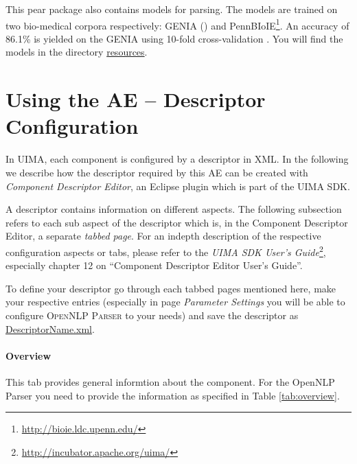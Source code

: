 \documentclass[11pt,a4paper,halfparskip]{scrartcl}
\begin{document}
This pear package also contains models for parsing. The
models are trained on two bio-medical corpora respectively: \textsc{GENIA} (\cite{ohta02})
and PennBIoIE\footnote{\url{http://bioie.ldc.upenn.edu/}}. An accuracy of 86.1\% is
yielded on the \textsc{GENIA} using 10-fold cross-validation \cite{buyko.biolink06}. You will find the models in the
directory \url{resources}.




\section{Using the AE -- Descriptor Configuration}

In UIMA, each component is configured by a descriptor in XML. In the
following we describe how the descriptor required by this AE can be
created with \emph{Component Descriptor Editor}, an Eclipse plugin
which is part of the UIMA SDK.

A descriptor contains information on different aspects. The following
subsection refers to each sub aspect of the descriptor which is, in
the Component Descriptor Editor, a separate \emph{tabbed page}. For an
indepth description of the respective configuration aspects or tabs,
please refer to the \emph{UIMA SDK User's
  Guide}\footnote{\url{http://incubator.apache.org/uima/}}, especially
chapter 12 on ``Component Descriptor Editor User's Guide''.

To define your descriptor go through each tabbed pages mentioned
here, make your respective entries (especially in page \emph{Parameter
Settings} you will be able to configure \textsc{OpenNLP Parser} 
to your needs) and save the descriptor as \url{DescriptorName.xml}.

\paragraph{Overview}
This tab provides general informtion about the component. For the
OpenNLP Parser you need to provide the information as
specified in Table
\ref{tab:overview}.
\end{document}
